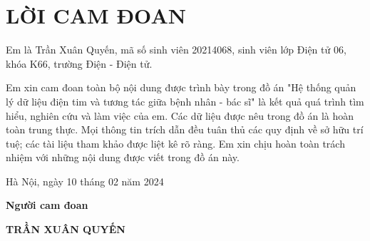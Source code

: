 \section*{LỜI CAM ĐOAN} %
\thispagestyle{empty}

Em là Trần Xuân Quyến, mã số sinh viên 20214068, sinh viên lớp Điện tử 06, khóa K66, trường Điện - Điện tử.

Em xin cam đoan toàn bộ nội dung được trình bày trong đồ án "Hệ thống quản lý dữ liệu điện tim và tương tác giữa bệnh nhân - bác sĩ" 
là kết quả quá trình tìm hiểu, nghiên cứu và làm việc của em. Các dữ liệu được nêu trong đồ án là hoàn toàn trung thực. 
Mọi thông tin trích dẫn đều tuân thủ các quy định về sở hữu trí tuệ; các tài liệu tham khảo được liệt kê rõ ràng. 
Em xin chịu hoàn toàn trách nhiệm với những nội dung được viết trong đồ án này.


\vspace{6pt}

\hspace{8cm}Hà Nội, ngày 10 tháng 02 năm 2024

\hspace{9cm}\textbf{Người cam đoan}

\vspace{2cm}
\hspace{8.5cm}\textbf{TRẦN XUÂN QUYẾN}

\cleardoublepage